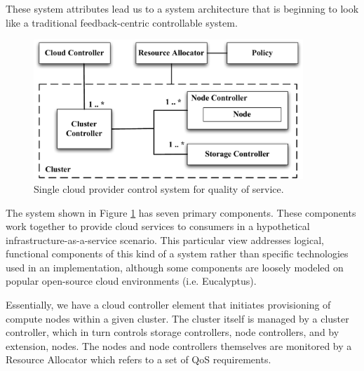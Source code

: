 \documentclass[notitlepage]{book}
\begin{document}
\begin{doublespace}
These system attributes lead us to a system architecture that is beginning to look like a traditional feedback-centric controllable system.

\begin{figure}[!t]
\centering
\includegraphics[width=4in]{SCP}
\caption{Single cloud provider control system for quality of service.}
\label{fig:single-qos}
\end{figure}

The system shown in Figure \ref{fig:single-qos} has seven primary components.  These components work together to provide cloud services to consumers in a hypothetical infrastructure-as-a-service scenario.  This particular view addresses logical, functional components of this kind of a system rather than specific technologies used in an implementation, although some components are loosely modeled on popular open-source cloud environments (i.e. Eucalyptus).

Essentially, we have a cloud controller element that initiates provisioning of compute nodes within a given cluster. The cluster itself is managed by a cluster controller, which in turn controls storage controllers, node controllers, and by extension, nodes.  The nodes and node controllers themselves are monitored by a Resource Allocator which refers to a set of QoS requirements.


\end{doublespace}
\end{document}
